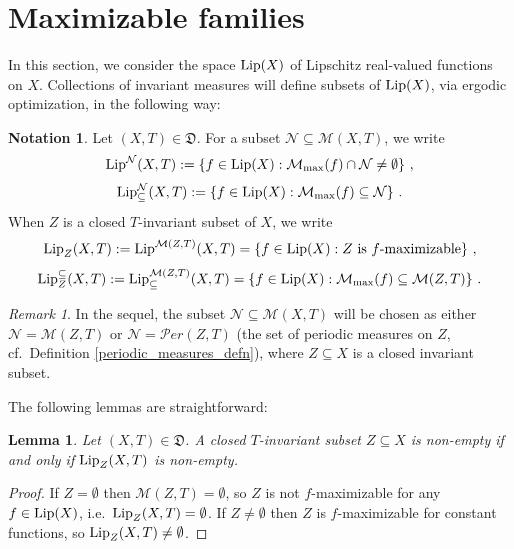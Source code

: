 \documentclass[reqno,11pt]{amsart}
\newtheorem{lem}[thm]{Lemma}
\theoremstyle{definition}
\newtheorem{notation}[thm]{Notation}
\theoremstyle{remark}
\theoremstyle{remark}
\newtheorem{rem}[thm]{Remark}
\def\m{\mathcal M}
\def\n{\mathcal N}
\def\per{{\mathcal{P}er}}
\def\lip{{\rm Lip}}
\def\D{\mathfrak{D}}
\numberwithin{equation}{section}
\begin{document}
\section{ Maximizable families}\label{maximizablefamiliessection}

In this section, we consider the space $\lip(X)$ of Lipschitz real-valued functions on $X$.
Collections of invariant measures will define subsets of $\lip(X)$, via ergodic optimization, in the following way:



\begin{notation}\label{maximizabledomaindefn}
Let $(X,T)\in\D$.
For a subset $\n\subseteq \m(X,T)$, we write
$$
\lip^\n(X,T)  := \left\{f\in \lip(X): \m_{\max}(f) \cap \n \neq\emptyset\right\}\,,
$$
$$
\lip_{\subseteq}^\n(X,T) := \left\{f\in \lip(X): \m_{\max}(f) \subseteq \n\right\}\,.
$$
When $Z$ is a closed $T$-invariant subset of $X$, 
we write
\begin{equation*}\label{LZdef}
\lip_Z(X,T):= \lip^{\m(Z,T)}(X,T)
= \left\{f\in \lip(X): Z\text{ is $f$-maximizable}\right\}\,,
\end{equation*}
\begin{equation*}
\lip_Z^\subseteq(X,T):= \lip^{\m(Z,T)}_\subseteq(X,T)
=  \left\{f\in \lip(X): \m_{\max}(f) \subseteq \m(Z,T)\right\}
 \,.
\end{equation*}
\end{notation}

\begin{rem}
In the sequel, the subset $\n\subseteq \m(X,T)$ will be chosen as either
$\n=\m(Z,T)$ or  $\n=\per(Z,T)$ (the set of periodic measures on $Z$, cf.~Definition \ref{periodic_measures_defn}), where $Z\subseteq X$ is a closed invariant subset.
\end{rem}




The following lemmas are straightforward:

\begin{lem}\label{LipZnonemptyiff}
Let $(X,T)\in\D$.
A closed $T$-invariant subset  $Z\subseteq X$ is non-empty
if and only if $\lip_Z(X,T)$ is non-empty.
\end{lem}
\begin{proof}
If $Z=\emptyset$ then $\m(Z,T)=\emptyset$, so  
$Z$ is not $f$-maximizable for any $f\in\lip(X)$, i.e.~$\lip_Z(X,T)=\emptyset$.
If $Z\neq\emptyset$ then $Z$ is $f$-maximizable for constant functions, so $\lip_Z(X,T)\neq\emptyset$.
\end{proof}
\end{document}
